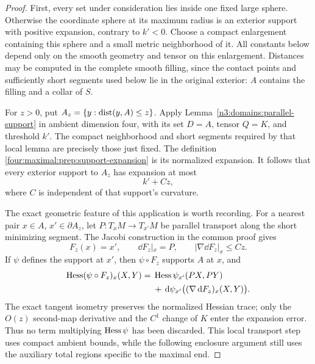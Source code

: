 \begin{proof}
First, every set under consideration lies inside one fixed large
sphere.  Otherwise the coordinate sphere at its maximum radius is
an exterior support with positive expansion, contrary to \(k'<0\).
Choose a compact enlargement containing this sphere and a small
metric neighborhood of it.  All constants below depend only on
the smooth geometry and tensor on this enlargement.  Distances
may be computed in the complete smooth filling, since the contact
points and sufficiently short segments used below lie in the
original exterior: \(A\) contains the filling and a collar of
\(S\).

For \(z>0\), put \(A_z=\{y:\operatorname{dist}(y,A)\le z\}\).
Apply Lemma~\ref{n3:domains:parallel-support} in ambient dimension
four, with its set \(D=A\), tensor \(Q=K\), and threshold
\(k'\).  The compact neighborhood and short segments required by
that local lemma are precisely those just fixed.  The definition
\eqref{four:maximal:prep:support-expansion} is its normalized
expansion.  It follows that every exterior support to \(A_z\)
has expansion at most
\begin{equation}
 k'+Cz,
\label{four:maximal:prep:parallel-support-bound}
\end{equation}
where \(C\) is independent of that support's curvature.

The exact geometric feature of this application is worth recording.
For a nearest pair \(x\in A\), \(x'\in\partial A_z\), let
\(P:T_xM\to T_{x'}M\) be parallel transport along the short
minimizing segment.  The Jacobi construction in the common proof gives
\begin{equation}
 F_z(x)=x',\qquad \dd F_z|_x=P,
 \qquad |\nabla\dd F_z|_x\le Cz.
\label{four:maximal:prep:exact-transport}
\end{equation}
If \(\psi\) defines the support at \(x'\), then
\(\psi\circ F_z\) supports \(A\) at \(x\), and
\begin{equation}
\begin{split}
 \operatorname{Hess}(\psi\circ F_z)_x(X,Y)
  ={}&\operatorname{Hess}\psi_{x'}(PX,PY)\\
    &+\,\mathrm d\psi_{x'}\bigl((\nabla\,\mathrm d F_z)_x(X,Y)\bigr).
\end{split}
\label{four:maximal:prep:hessian-pullback}
\end{equation}
The exact tangent isometry preserves the normalized Hessian trace;
only the \(O(z)\) second-map derivative and the \(C^1\) change
of \(K\) enter the expansion error.  Thus no term multiplying
\(\operatorname{Hess}\psi\) has been discarded.  This local transport step
uses compact ambient bounds, while the following enclosure argument
still uses the auxiliary total regions specific to the maximal end.


\end{proof}
